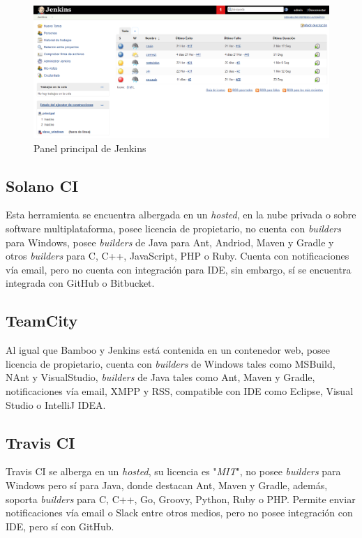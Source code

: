 \begin{figure}[!h]
\centering
   \includegraphics[width=16cm]{PanelPrincipal_Jenkins.PNG}
\caption{Panel principal de Jenkins}
\end{figure}

\subsection{Solano CI}

Esta herramienta se encuentra albergada en un \textit{hosted}, en la nube privada o sobre software multiplataforma, posee licencia de propietario, no cuenta con \textit{builders} para Windows, posee \textit{builders} de Java para Ant, Andriod, Maven y Gradle y otros \textit{builders} para C, C++, JavaScript, PHP o Ruby. Cuenta con notificaciones vía email, pero no cuenta con integración para \ac{IDE}, sin embargo, sí se encuentra integrada con GitHub o Bitbucket.

\subsection{TeamCity}

Al igual que Bamboo y Jenkins está contenida en un contenedor web, posee licencia de propietario, cuenta con \textit{builders} de Windows tales como MSBuild, NAnt y VisualStudio, \textit{builders} de Java tales como Ant, Maven y Gradle, notificaciones vía email, XMPP y RSS, compatible con \ac{IDE} como Eclipse, Visual Studio o IntelliJ IDEA.

\clearpage

\subsection{Travis CI}

Travis CI se alberga en un \textit{hosted}, su licencia es "\textit{MIT}", no posee \textit{builders} para Windows pero sí para Java, donde destacan Ant, Maven y Gradle, además, soporta \textit{builders} para C, C++, Go, Groovy, Python, Ruby o PHP. Permite enviar notificaciones vía email o Slack entre otros medios, pero no posee integración con \ac{IDE}, pero sí con GitHub.

